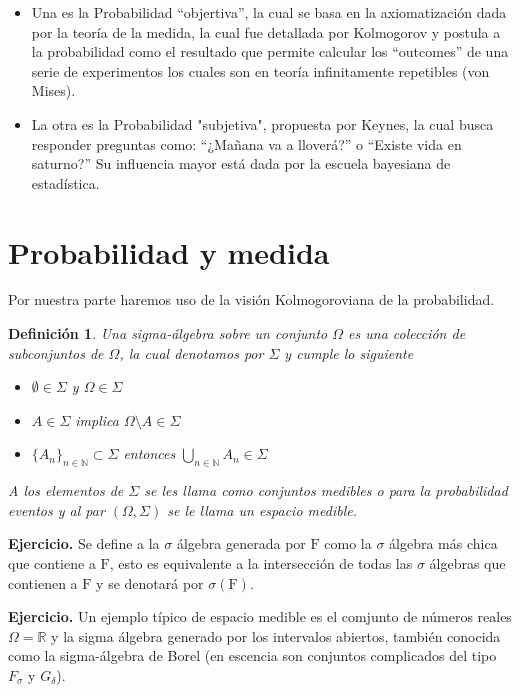 \documentclass[letterpaper]{book}
\newtheorem{def.}{Definici\'on}[section]
\newcommand{\nat}{\ensuremath{ \mathbb N }}
\newcommand{\eje}{{\newline \noindent \sc \textbf{Ejercicio. }}}
\newcommand{\re}{\ensuremath{\mathbb R }}
\begin{document}
\begin{itemize}
\item Una es la Probabilidad ``objertiva'', la cual se basa en la axiomatización dada por la teoría de la medida, la cual fue detallada por Kolmogorov y postula a la probabilidad como el resultado que permite calcular los ``outcomes'' de una serie de experimentos los cuales son en teoría infinitamente repetibles (von Mises).

\item La otra es la Probabilidad "subjetiva", propuesta por Keynes, la cual busca responder preguntas como: ``¿Mañana va a lloverá?'' o ``Existe vida en saturno?'' Su influencia mayor está dada por la escuela bayesiana de estadística.
\end{itemize}
\section{Probabilidad y medida}
\label{sec:org0055f65}
\noindent Por nuestra parte haremos uso de la visión Kolmogoroviana de la probabilidad.
\begin{def.}
Una \emph{sigma-álgebra} sobre un conjunto \(\Omega\) es una colección de subconjuntos de \(\Omega\), la cual denotamos por \(\Sigma\) y cumple lo siguiente
\begin{itemize}
\item \(\emptyset\in\Sigma\) y \(\Omega\in\Sigma\)
\item \(A\in\Sigma\) implica \(\Omega\setminus A\in\Sigma\)
\item \(\{A_n\}_{n\in\nat}\subset\Sigma\) entonces \(\bigcup_{n\in\nat} A_n\in\Sigma\)
\end{itemize}
A los elementos de \(\Sigma\) se les llama como \emph{conjuntos medibles} o para la probabilidad \emph{eventos} y al par \((\Omega,\Sigma)\) se le llama un espacio medible.
\end{def.}

\eje Se define a la \(\sigma\) álgebra generada por \(\mathrm{F}\) como la \(\sigma\) álgebra más chica que contiene a \(\mathrm{F}\), esto es equivalente a la intersección de todas las \(\sigma\) álgebras que contienen a \(\mathrm{F}\) y se denotará por \(\sigma(\mathrm{F})\).

\eje Un ejemplo típico de espacio medible es el comjunto de números reales \(\Omega=\re\) y la sigma álgebra generado por los intervalos abiertos, también conocida como la sigma-álgebra de Borel (en escencia son conjuntos complicados del tipo \(F_{\sigma}\) y \(G_{\delta}\)).
\end{document}
